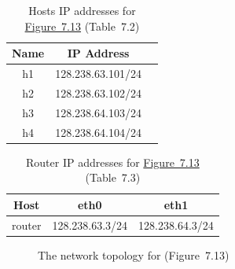 \documentclass{../UTNetLab}
\begin{document}
    \begin{table}[H]
        \caption{Hosts IP addresses for \hyperref[fig:7.13]{Figure~7.13} (Table~7.2)}
        \label{tab:7.2}
        \centering
        \begin{tabular}{ *3c }
            \hline \hline
            Name & IP Address \\
            \hline
                h1 & 128.238.63.101/24 \\
                h2 & 128.238.63.102/24 \\
                h3 & 128.238.64.103/24 \\
                h4 & 128.238.64.104/24 \\
            \hline \hline
            \end{tabular}
    \end{table}

    \begin{table}[H]
        \caption{Router IP addresses for \hyperref[fig:7.13]{Figure~7.13} (Table~7.3)}
        \label{tab:7.3}
        \centering
        \begin{tabular}{ *3c }
            \hline \hline
            Host & eth0 & eth1 \\
            \hline
            router & 128.238.63.3/24 & 128.238.64.3/24 \\
            \hline \hline
            \end{tabular}
    \end{table}

    \begin{figure}[H]
        \centering
        \caption{The network topology for  (Figure~7.13)}
        \label{fig:7.13}
    \end{figure}
\end{document}
